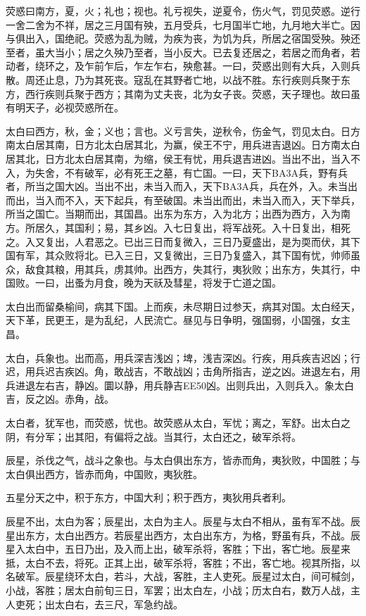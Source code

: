 \documentclass[]{article}
\begin{document}
荧惑曰南方，夏，火；礼也；视也。礼亏视失，逆夏令，伤火气，罚见荧惑。逆行一舍二舍为不祥，居之三月国有殃，五月受兵，七月国半亡地，九月地大半亡。因与俱出入，国绝祀。荧惑为乱为贼，为疾为丧，为饥为兵，所居之宿国受殃。殃还至者，虽大当小；居之久殃乃至者，当小反大。已去复还居之，若居之而角者，若动者，绕环之，及乍前乍后，乍左乍右，殃愈甚。一曰，荧惑出则有大兵，入则兵散。周还止息，乃为其死丧。寇乱在其野者亡地，以战不胜。东行疾则兵聚于东方，西行疾则兵聚于西方；其南为丈夫丧，北为女子丧。荧惑，天子理也。故曰虽有明天子，必视荧惑所在。

太白曰西方，秋，金；义也；言也。义亏言失，逆秋令，伤金气，罚见太白。日方南太白居其南，日方北太白居其北，为赢，侯王不宁，用兵进吉退凶。日方南太白居其北，日方北太白居其南，为缩，侯王有忧，用兵退吉进凶。当出不出，当入不入，为失舍，不有破军，必有死王之墓，有亡国。一曰，天下BA3A兵，野有兵者，所当之国大凶。当出不出，未当入而入，天下BA3A兵，兵在外，入。未当出而出，当入而不入，天下起兵，有至破国。未当出而出，未当入而入，天下举兵，所当之国亡。当期而出，其国昌。出东为东方，入为北方；出西为西方，入为南方。所居久，其国利；易，其乡凶。入七日复出，将军战死。入十日复出，相死之。入又复出，人君恶之。已出三日而复微入，三日乃夏盛出，是为耎而伏，其下国有军，其众败将北。已入三日，又复微出，三日乃复盛入，其下国有忧，帅师虽众，敌食其粮，用其兵，虏其帅。出西方，失其行，夷狄败；出东方，失其行，中国败。一曰，出蚤为月食，晚为天祅及彗星，将发于亡道之国。

太白出而留桑榆间，病其下国。上而疾，未尽期日过参天，病其对国。太白经天，天下革，民更王，是为乱纪，人民流亡。昼见与日争明，强国弱，小国强，女主昌。

太白，兵象也。出而高，用兵深吉浅凶；埤，浅吉深凶。行疾，用兵疾吉迟凶；行迟，用兵迟吉疾凶。角，敢战吉，不敢战凶；击角所指吉，逆之凶。进退左右，用兵进退左右吉，静凶。圜以静，用兵静吉EE50凶。出则兵出，入则兵入。象太白吉，反之凶。赤角，战。

太白者，犹军也，而荧惑，忧也。故荧惑从太白，军忧；离之，军舒。出太白之阴，有分军；出其阳，有偏将之战。当其行，太白还之，破军杀将。

辰星，杀伐之气，战斗之象也。与太白俱出东方，皆赤而角，夷狄败，中国胜；与太白俱出西方，皆赤而角，中国败，夷狄胜。

五星分天之中，积于东方，中国大利；积于西方，夷狄用兵者利。

辰星不出，太白为客；辰星出，太白为主人。辰星与太白不相从，虽有军不战。辰星出东方，太白出西方。若辰星出西方，太白出东方，为格，野虽有兵，不战。辰星入太白中，五日乃出，及入而上出，破军杀将，客胜；下出，客亡地。辰星来抵，太白不去，将死。正其上出，破军杀将，客胜；不出，客亡地。视其所指，以名破军。辰星绕环太白，若斗，大战，客胜，主人吏死。辰星过太白，间可椷剑，小战，客胜；居太白前旬三日，军罢；出太白左，小战；历太白右，数万人战，主人吏死；出太白右，去三尺，军急约战。
\end{document}
